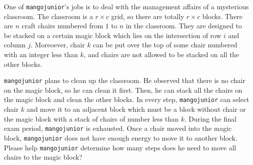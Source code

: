 One of \texttt{mangojunior}'s jobs is to deal with the management affairs of a mysterious classroom. 
The classroom is a $r\times c$ grid, so there are totally $r\times c$ blocks. 
There are $n$ craft chairs numbered from $1$ to $n$ in the classroom.
They are designed to be stacked on a certain magic block which lies on the intersection of row $i$ and column $j$.
Moreoever, chair $k$ can be put over the top of some chair numbered with an integer less than $k$, 
and chairs are not allowed to be stacked on all the other blocks.
 
\texttt{mangojunior} plans to clean up the classroom. 
He observed that there is no chair on the magic block, so he can clean it first.
Then, he can stack all the chairs on the magic block and clean the other blocks.
In every step, \texttt{mangojunior} can select chair $k$ and move it to an adjacent block which
must be a block without chair or the magic block with a stack of chairs of number less than $k$.
During the final exam period, \texttt{mangojunior} is exhausted. 
Once a chair moved into the magic block, \texttt{mangojunior} does not have enough energy to move it to another block. 
Please help \texttt{mangojunior} determine how many steps does he need to move all chairs to the magic block?
